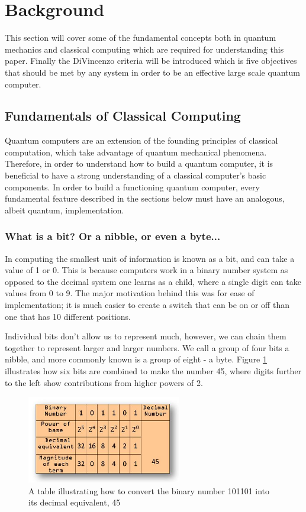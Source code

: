 \section{Background}

This section will cover some of the fundamental concepts both in quantum mechanics and classical computing which are required for understanding this paper. 
Finally the DiVincenzo criteria will be introduced which is five objectives that should be met by any system in order to be an effective large scale quantum computer. 

\subsection{Fundamentals of Classical Computing}
Quantum computers are an extension of the founding principles of classical computation, which take advantage of quantum mechanical phenomena. Therefore, in order to understand how to build a quantum computer, it is beneficial to have a strong understanding of a classical computer's basic components. In order to build a functioning quantum computer, every fundamental feature described in the sections below must have an analogous, albeit quantum, implementation.
\subsubsection{What is a bit? Or a nibble, or even a byte...}
In computing the smallest unit of information is known as a bit, and can take a value of 1 or 0. This is because computers work in a binary number system as opposed to the decimal system one learns as a child, where a single digit can take values from 0 to 9. The major motivation behind this was for ease of implementation; it is much easier to create a switch that can be on or off than one that has 10 different positions. 

Individual bits don't allow us to represent much, however, we can chain them together to represent larger and larger numbers. We call a group of four bits a nibble, and more commonly known is a group of eight - a byte. Figure \ref{fig:BINARY} illustrates how six bits are combined to make the number 45, where digits further to the left show contributions from higher powers of 2.
\begin{figure}[H]
    \centering
    \includegraphics[width=0.6\textwidth]{images/binary.jpg}
    \caption{A table illustrating how to convert the binary number 101101 into its decimal equivalent, 45 \cite{binary}}\label{fig:BINARY}
\end{figure}

